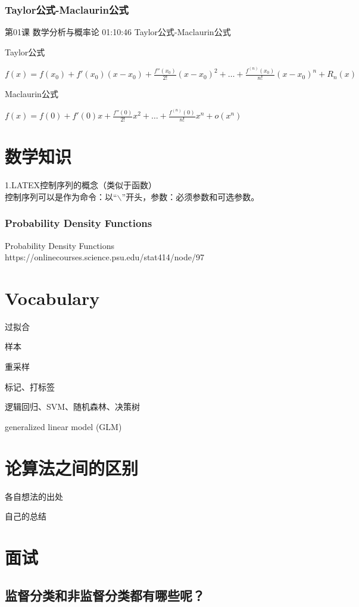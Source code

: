 \documentclass[UTF8]{ctexart}
\begin{document}
\subsubsection{Taylor公式-Maclaurin公式}

第01课 数学分析与概率论 01:10:46 Taylor公式-Maclaurin公式

Taylor公式

$f(x)=f(x_{0})+f'(x_{0})(x-x_{0})+\frac{f''(x_{0})}{2!}(x-x_{0})^{2}+\dots+\frac{f^{(n)}(x_{0})}{n!}(x-x_{0})^{n}+R_{n}(x)$

Maclaurin公式

$f(x)=f(0)+f'(0)x+\frac{f''(0)}{2!}x^{2}+\dots+\frac{f^{(n)}(0)}{n!}x^{n}+o(x^{n})$

\section{数学知识}
    1.LATEX控制序列的概念（类似于函数） \\ 控制序列可以是作为命令：以“$\backslash$”开头，参数：必须参数和可选参数。
\subsubsection{Probability Density Functions}

Probability Density Functions https://onlinecourses.science.psu.edu/stat414/node/97

\section{Vocabulary}

过拟合

样本

重采样

标记、打标签

逻辑回归、SVM、随机森林、决策树

generalized linear model (GLM)

\section{论算法之间的区别}

各自想法的出处

自己的总结

\section{面试}

\subsection{监督分类和非监督分类都有哪些呢？}
\end{document}
